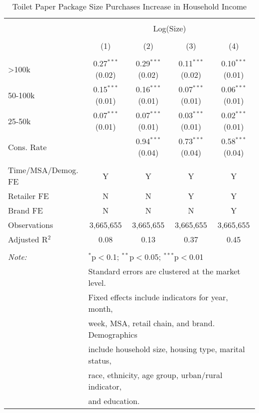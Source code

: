 
\begin{table}[!htbp] \centering 
  \caption{Toilet Paper Package Size Purchases Increase in Household Income} 
  \label{tab:packageSizeFullTP} 
\begin{tabular}{@{\extracolsep{5pt}}lcccc} 
\\[-1.8ex]\hline 
\hline \\[-1.8ex] 
 & \multicolumn{4}{c}{Log(Size)} \\ 
\\[-1.8ex] & (1) & (2) & (3) & (4)\\ 
\hline \\[-1.8ex] 
 >100k & 0.27$^{***}$ (0.02) & 0.29$^{***}$ (0.02) & 0.11$^{***}$ (0.02) & 0.10$^{***}$ (0.01) \\ 
  50-100k & 0.15$^{***}$ (0.01) & 0.16$^{***}$ (0.01) & 0.07$^{***}$ (0.01) & 0.06$^{***}$ (0.01) \\ 
  25-50k & 0.07$^{***}$ (0.01) & 0.07$^{***}$ (0.01) & 0.03$^{***}$ (0.01) & 0.02$^{***}$ (0.01) \\ 
  Cons. Rate &  & 0.94$^{***}$ (0.04) & 0.73$^{***}$ (0.04) & 0.58$^{***}$ (0.04) \\ 
 \hline \\[-1.8ex] 
Time/MSA/Demog. FE & Y & Y & Y & Y \\ 
Retailer FE & N & N & Y & Y \\ 
Brand FE & N & N & N & Y \\ 
Observations & 3,665,655 & 3,665,655 & 3,665,655 & 3,665,655 \\ 
Adjusted R$^{2}$ & 0.08 & 0.13 & 0.37 & 0.45 \\ 
\hline 
\hline \\[-1.8ex] 
\textit{Note:}  & \multicolumn{4}{l}{$^{*}$p$<$0.1; $^{**}$p$<$0.05; $^{***}$p$<$0.01} \\ 
 & \multicolumn{4}{l}{Standard errors are clustered at the market level.} \\ 
 & \multicolumn{4}{l}{Fixed effects include indicators for year, month, } \\ 
 & \multicolumn{4}{l}{week, MSA, retail chain, and brand. Demographics } \\ 
 & \multicolumn{4}{l}{include household size, housing type, marital status, } \\ 
 & \multicolumn{4}{l}{race, ethnicity, age group, urban/rural indicator, } \\ 
 & \multicolumn{4}{l}{and education.} \\ 
\end{tabular} 
\end{table} 
